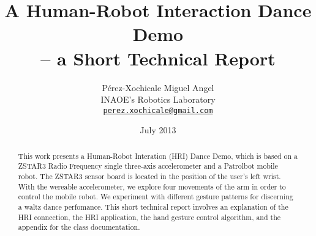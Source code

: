 \documentclass[12pt,a4paper,openright]{report}
\begin{document}
\title{A Human-Robot Interaction Dance Demo \\ -- a Short Technical Report}
\author{P\'erez-Xochicale Miguel Angel\\
    INAOE's Robotics Laboratory\\
    \href{mailto:perez.xochicale@gmail.com}{\nolinkurl{perez.xochicale@gmail.com} } 
    }

\date{July 2013}

\maketitle


\begin{abstract}
This work presents a Human-Robot Interation (HRI) Dance Demo, 
which is based on a ZSTAR3 Radio Frequency single three-axis 
accelerometer and a Patrolbot mobile robot.
The ZSTAR3 sensor board is located in the position of the user's left
wrist. With the wereable accelerometer, 
we explore four movements of the arm in order to control the mobile robot.
We experiment with different gesture patterns for discerning 
a waltz dance perfomance.
This short technical report involves an explanation of the HRI connection,
the HRI application, the hand gesture control algorithm, and the appendix 
for the class documentation.


\end{abstract}

\tableofcontents

\cleardoublepage
\setcounter{page}{1}





\appendix






\end{document}
